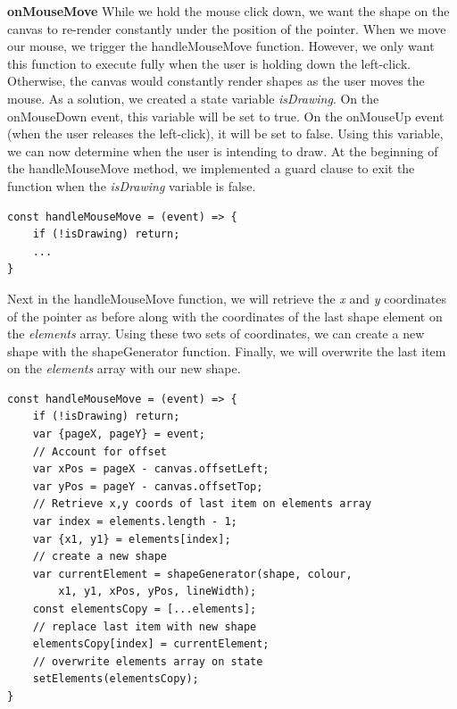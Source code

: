 \begin{enumerate}
    \textbf{onMouseMove} \newline
    While we hold the mouse click down, we want the shape on the canvas to re-render constantly under the position of the pointer. \newline 
    When we move our mouse, we trigger the handleMouseMove function. However, we only want this function to execute fully when the user is holding down the left-click. Otherwise, the canvas would constantly render shapes as the user moves the mouse. \newline
    As a solution, we created a state variable \textit{isDrawing}. On the onMouseDown event, this variable will be set to true. On the onMouseUp event (when the user releases the left-click), it will be set to false. Using this variable, we can now determine when the user is intending to draw. \newline 
    At the beginning of the handleMouseMove method, we implemented a guard clause to exit the function when the \textit{isDrawing} variable is false. 
    \begin{verbatim}
const handleMouseMove = (event) => {
    if (!isDrawing) return;
    ...
}
    \end{verbatim}
    Next in the handleMouseMove function, we will retrieve the \textit{x} and \textit{y} coordinates of the pointer as before along with the coordinates of the last shape element on the \textit{elements} array. Using these two sets of coordinates, we can create a new shape with the shapeGenerator function. Finally, we will overwrite the last item on the \textit{elements} array with our new shape. 
    
    \begin{verbatim}
const handleMouseMove = (event) => {
    if (!isDrawing) return;
    var {pageX, pageY} = event;
    // Account for offset
    var xPos = pageX - canvas.offsetLeft;
    var yPos = pageY - canvas.offsetTop;
    // Retrieve x,y coords of last item on elements array
    var index = elements.length - 1;
    var {x1, y1} = elements[index];
    // create a new shape 
    var currentElement = shapeGenerator(shape, colour,
        x1, y1, xPos, yPos, lineWidth);
    const elementsCopy = [...elements];
    // replace last item with new shape 
    elementsCopy[index] = currentElement;
    // overwrite elements array on state 
    setElements(elementsCopy);
}
    \end{verbatim}
    

\end{enumerate}
